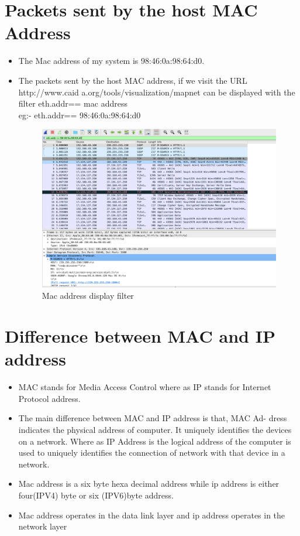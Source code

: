 \section{Packets sent by the host MAC Address}
\begin{itemize}
\item The Mac address of my system is 98:46:0a:98:64:d0.
\item The packets sent by the host MAC address, if we visit the URL http://www.caid a.org/tools/visualization/mapnet can be displayed with the filter eth.addr== mac address
\\eg:- eth.addr== 98:46:0a:98:64:d0
\begin{figure}[H]
\centering
  \includegraphics[width=400pt]{Images/mac.png}
  \caption{Mac address display filter}
  \label{fig:2.5}
\end{figure}
\end{itemize}

\section{Difference between MAC and IP address}
\begin{itemize}
\item MAC stands for Media Access Control where as IP stands for Internet Protocol address.
\item The main difference between MAC and IP address is that, MAC Ad- dress indicates the physical address of computer. It uniquely identifies the devices on a network. Where as IP Address is the logical address of the computer is used to uniquely identifies the connection of network with that device in a network.
\item Mac address is a six byte hexa decimal address while ip address is either four(IPV4) byte or six (IPV6)byte address.
\item Mac address operates in the data link layer and ip address operates in the network layer
\end{itemize}

